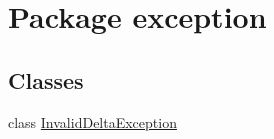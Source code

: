 \hypertarget{namespaceexception}{
\section{Package exception}
\label{namespaceexception}
}
\subsection*{Classes}
\begin{DoxyCompactItemize}
\item 
class \hyperlink{classexception_1_1_invalid_delta_exception}{InvalidDeltaException}
\end{DoxyCompactItemize}

